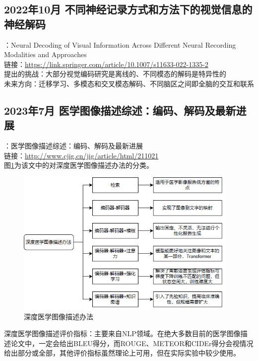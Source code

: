 \documentclass[12pt, a4paper, oneside]{ctexart}
\begin{document}
    \subsection{2022年10月 不同神经记录方式和方法下的视觉信息的神经解码\cite{Zhang2022NeuralDO}}
    ：Neural Decoding of Visual Information Across Different Neural Recording Modalities and Approaches\\
    链接：\url{https://link.springer.com/article/10.1007/s11633-022-1335-2}\\
    提出的挑战：大部分视觉编码研究是离线的、不同模态的解码是特异性的\\
    未来方向：迁移学习、多模态和交叉模态解码、不同脑区之间即全脑的交互和联系

    \subsection{2023年7月 医学图像描述综述：编码、解码及最新进展\cite{Zhu2023JoIG}}
    ：医学图像描述综述：编码、解码及最新进展\\
    链接：\url{http://www.cjig.cn/jig/article/html/211021}\\
    图\ref{Fig_deepmedicalimages}为该文中的对深度医学图像描述办法的分类。

    \begin{figure}[ptbp]
       \centering
       \includegraphics[width=0.95\textwidth]{pic/3.2_structure.png}
       \caption{深度医学图像描述办法}
       \label{Fig_deepmedicalimages}
    \end{figure}

    深度医学图像描述评价指标：主要来自NLP领域。在绝大多数目前的医学图像描述论文中，一定会给出BLEU得分，而ROUGE、METEOR和CIDEr得分会视情况给出部分或全部，其他评价指标虽然理论上可用，但在实际实验中较少使用。
\end{document}
